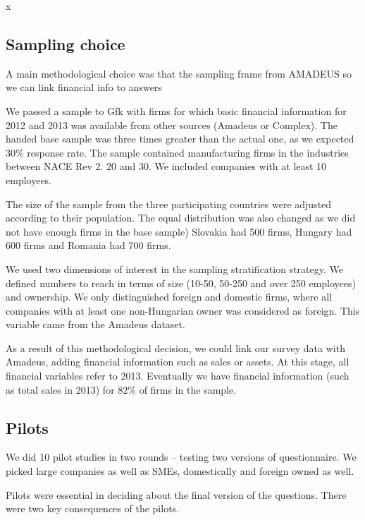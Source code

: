 x\documentclass[final, dvipsnames, authoryear,12pt]{elsarticle}
\begin{document}
\subsection{Sampling choice}
A main methodological choice was that the sampling frame from AMADEUS so we can link financial info to answers

We passed a sample to Gfk with firms for which basic financial information for 2012 and 2013 was available from other sources (Amadeus or Complex). The handed base sample was three times greater than the actual one, as we expected 30\% response rate. The sample contained manufacturing firms in the industries between NACE Rev 2. 20 and 30. We included companies with at least 10 employees. 



The size of the sample from the three participating countries were adjusted according to their population. The equal distribution was also changed as we did not have enough firms in the base sample) Slovakia had 500 firms, Hungary had 600 firms and Romania had 700 firms.

We used two dimensions of interest in the sampling stratification strategy. We defined numbers to reach in terms of size (10-50, 50-250 and over 250 employees) and ownership. We only distinguished foreign and domestic firms, where all companies with at least one non-Hungarian owner was considered as foreign. This variable came from the Amadeus dataset.

As a result of this methodological decision, we could link our survey data with Amadeus, adding financial information such as sales or assets. At this stage, all financial variables refer to 2013. Eventually we have financial information (such as total sales in 2013) for 82\% of firms in the sample. 

\subsection{Pilots}

We did 10 pilot studies in two rounds – testing two versions of questionnaire. We picked large companies as well as SMEs, domestically and foreign owned as well.

Pilots were essential in deciding about the final version of the questions. There were two key consequences of the pilots.
\end{document}
